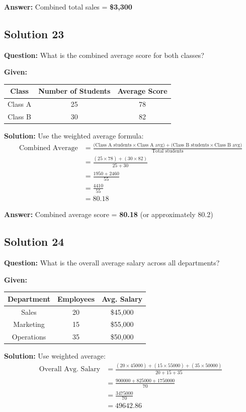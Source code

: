 \documentclass[12pt,a4paper]{article}
\begin{document}
\textbf{Answer:} Combined total sales = \textbf{\$3,300}

\subsection*{Solution 23}
\textbf{Question:} What is the combined average score for both classes?

\textbf{Given:}
\begin{center}
\begin{tabular}{|c|c|c|}
\hline
Class & Number of Students & Average Score \\
\hline
Class A & 25 & 78 \\
Class B & 30 & 82 \\
\hline
\end{tabular}
\end{center}

\textbf{Solution:} Use the weighted average formula:
\begin{align*}
\text{Combined Average} &= \frac{\text{(Class A students} \times \text{Class A avg)} + \text{(Class B students} \times \text{Class B avg)}}{\text{Total students}} \\
&= \frac{(25 \times 78) + (30 \times 82)}{25 + 30} \\
&= \frac{1950 + 2460}{55} \\
&= \frac{4410}{55} \\
&= 80.18
\end{align*}

\textbf{Answer:} Combined average score = \textbf{80.18} (or approximately 80.2)

\subsection*{Solution 24}
\textbf{Question:} What is the overall average salary across all departments?

\textbf{Given:}
\begin{center}
\begin{tabular}{|c|c|c|}
\hline
Department & Employees & Avg. Salary \\
\hline
Sales & 20 & \$45,000 \\
Marketing & 15 & \$55,000 \\
Operations & 35 & \$50,000 \\
\hline
\end{tabular}
\end{center}

\textbf{Solution:} Use weighted average:
\begin{align*}
\text{Overall Avg. Salary} &= \frac{(20 \times 45000) + (15 \times 55000) + (35 \times 50000)}{20 + 15 + 35} \\
&= \frac{900000 + 825000 + 1750000}{70} \\
&= \frac{3475000}{70} \\
&= 49642.86
\end{align*}
\end{document}
